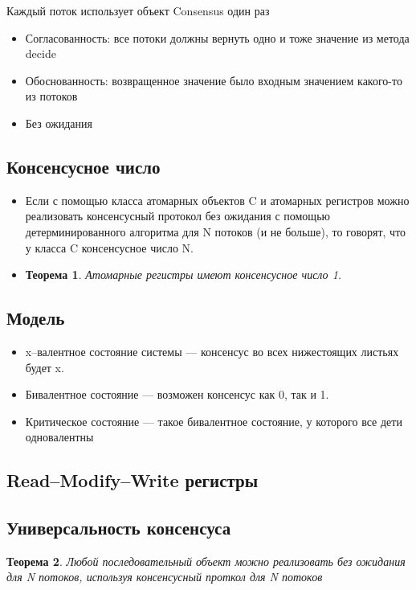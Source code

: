 \documentclass[10pt,a4paper,oneside,titlepage]{article}
\theoremstyle{plain}
\newtheorem{theorem}{Теорема}[section]
\theoremstyle{defenition}
\begin{document}
Каждый поток использует объект Consensus один раз

\begin{itemize}
	\item Согласованность: все потоки должны вернуть одно и тоже значение из метода decide
	\item Обоснованность: возвращенное значение было входным значением какого-то из потоков
	\item Без ожидания
\end{itemize}

\subsection{Консенсусное число}
\begin{itemize}
	\item Если с помощью класса атомарных объектов C и атомарных регистров можно реализовать консенсусный протокол без ожидания с помощью детерминированного алгоритма для N потоков (и не больше), то говорят, что у класса C консенсусное число N.
	\item \begin{theorem}
		Атомарные регистры имеют консенсусное число 1.
	\end{theorem} 
\end{itemize}

\subsection{Модель}
\begin{itemize}
	\item x--валентное состояние системы --- консенсус во всех нижестоящих листьях будет x.
	\item Бивалентное состояние --- возможен консенсус как 0, так и 1.
	\item Критическое состояние --- такое бивалентное состояние, у которого все дети одновалентны
\end{itemize}

\subsection{Read--Modify--Write регистры}

\subsection{Универсальность консенсуса}
\begin{theorem}
	Любой последовательный объект можно реализовать без ожидания для N потоков, используя консенсусный проткол для N потоков
\end{theorem}
\end{document}
